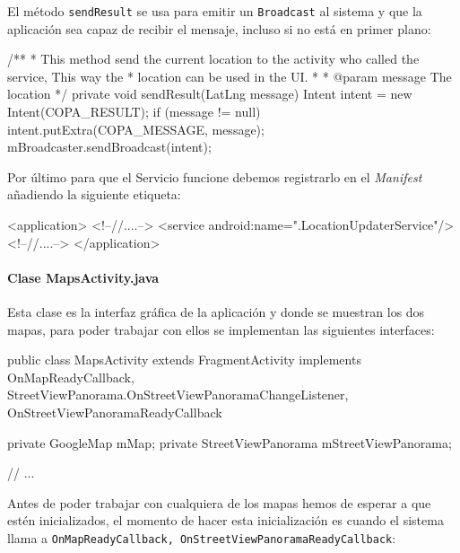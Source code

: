 \documentclass[	DIV=calc,%
							paper=a4,%
							fontsize=11pt]{scrartcl}	 					%
\begin{document}
El método \texttt{sendResult} se usa para emitir un \texttt{Broadcast}
al sistema y que la aplicación sea capaz de recibir el mensaje, incluso
si no está en primer plano:

\begin{javacode}
	/**
	 * This method send the current location to the activity who called the service, This way the
	 * location can be used in the UI.
	 *
	 * @param message The location
	 */
	private void sendResult(LatLng message) {
			Intent intent = new Intent(COPA_RESULT);
			if (message != null)
					intent.putExtra(COPA_MESSAGE, message);
			mBroadcaster.sendBroadcast(intent);
	}
\end{javacode}

Por último para que el Servicio funcione debemos registrarlo en el
\emph{Manifest} añadiendo la siguiente etiqueta:

\begin{xmlcode}
	<application>
		<!--//....-->
		<service android:name=".LocationUpdaterService"/>
		<!--//....-->
	</application>
\end{xmlcode}

\paragraph{Clase MapsActivity.java}\label{clase-mapsactivity.java}

Esta clase es la interfaz gráfica de la aplicación y donde se muestran
los dos mapas, para poder trabajar con ellos se implementan las
siguientes interfaces:

\begin{javacode}
	public class MapsActivity extends FragmentActivity implements
	        OnMapReadyCallback,
	        StreetViewPanorama.OnStreetViewPanoramaChangeListener,
	        OnStreetViewPanoramaReadyCallback {

				private GoogleMap mMap;
		    private StreetViewPanorama mStreetViewPanorama;

				// ...
	}
\end{javacode}

Antes de poder trabajar con cualquiera de los mapas hemos de esperar a
que estén inicializados, el momento de hacer esta inicialización es
cuando el sistema llama a \texttt{OnMapReadyCallback, OnStreetViewPanoramaReadyCallback}:
\end{document}
